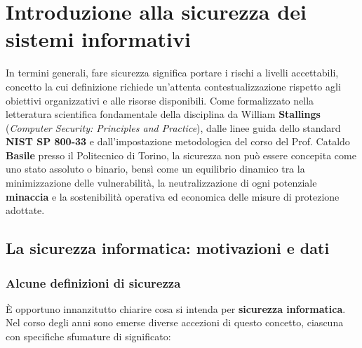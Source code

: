 \documentclass[../../main.tex]{subfiles}
\begin{document}
\chapter{Introduzione alla sicurezza dei sistemi informativi}
\label{ch:introduzione}

In termini generali, fare sicurezza significa portare i rischi a livelli accettabili, concetto la cui definizione richiede un'attenta contestualizzazione rispetto agli obiettivi organizzativi e alle risorse disponibili. Come formalizzato nella letteratura scientifica fondamentale della disciplina da William \textbf{Stallings} (\textit{Computer Security: Principles and Practice}), dalle linee guida dello standard \textbf{NIST SP 800-33} e dall'impostazione metodologica del corso del Prof. Cataldo \textbf{Basile} presso il Politecnico di Torino, la sicurezza non può essere concepita come uno stato assoluto o binario, bensì come un equilibrio dinamico tra la minimizzazione delle vulnerabilità, la neutralizzazione di ogni potenziale \textbf{minaccia} e la sostenibilità operativa ed economica delle misure di protezione adottate.

\section{La sicurezza informatica: motivazioni e dati}
\label{sec:motivazioni_e_dati}

\subsection{Alcune definizioni di sicurezza}
\label{subsec:alcune_definizioni}

È opportuno innanzitutto chiarire cosa si intenda per \textbf{sicurezza informatica}. Nel corso degli anni sono emerse diverse accezioni di questo concetto, ciascuna con specifiche sfumature di significato:
\end{document}
